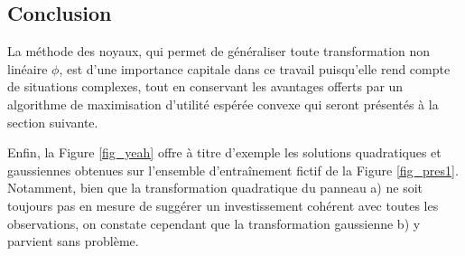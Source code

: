 \subsection{Conclusion}

La méthode des noyaux, qui permet de généraliser toute transformation non linéaire $\phi$,
est d'une importance capitale dans ce travail puisqu'elle rend compte de situations
complexes, tout en conservant les avantages offerts par un algorithme de maximisation
d'utilité espérée convexe qui seront présentés à la section suivante.

Enfin, la Figure \ref{fig_yeah} offre à titre d'exemple les solutions quadratiques et
gaussiennes obtenues sur l'ensemble d'entraînement fictif de la Figure
\ref{fig_pres1}. Notamment, bien que la transformation quadratique du panneau a) ne soit
toujours pas en mesure de suggérer un investissement cohérent avec toutes les
observations, on constate cependant que la transformation gaussienne b) y parvient sans
problème.

